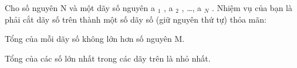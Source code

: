 Cho số nguyên N và một dãy số nguyên a   $_    1   $   , a   $_    2   $   , …, a   $_    N   $   . Nhiệm vụ của bạn là phải cắt dãy số trên thành một số dãy số (giữ nguyên thứ tự) thỏa mãn:  

   Tổng của mỗi dãy số không lớn hơn số nguyên M.  

   Tổng của các số lớn nhất trong các dãy trên là nhỏ nhất.